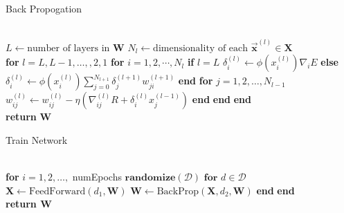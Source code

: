 \documentclass[prl,amsmath,amssymb,floatfix,superscriptaddress,notitlepage,twocolumn]{revtex4}
\newcommand{\vc}[1]{\vec{\mathbf{#1}}} 								%
\begin{document}
\begin{algorithm}[H]
\caption{Back Propogation}\label{back_prop}
\begin{algorithmic}[]
\Procedure{BackProp}{\textbf{X}, $\vc y$, \textbf{W}}\\
\State $L \gets \text{number of layers in }\textbf{W}$
\State $N_l \gets \text{dimensionality of each } \vc x^{(l)} \in \textbf{X}$\\

\State \textbf{for} $l=L,L-1,\dots,,2,1$
\State \hspace{.25cm}\textbf{for} $i = 1,2,\cdots, N_l$
\State \hspace{.50cm}\textbf{if} $l=L$
\State \hspace{.75cm} $\delta^{(l)}_i \gets \phi(x_i^{(l)})\nabla_i E$
\State \hspace{.50cm}\textbf{else}
\State \hspace{.75cm} $\delta^{(l)}_i\gets \phi(x^{(l)}_i)\sum_{j=0}^{N_{l+1}}\delta^{(l+1)}_jw^{(l+1)}_{ji}$
\State \hspace{.50cm}\textbf{end}
\State \hspace{.50cm}\textbf{for} $j=1,2,\dots,N_{l-1}$
\State \hspace{.75cm}$w^{(l)}_{ij}\gets w^{(l)}_{ij}-\eta\left(\nabla^{(l)}_{ij}R+\delta^{(l)}_ix^{(l-1)}_j\right)$
\State \hspace{.50cm}\textbf{end}
\State \hspace{.25cm}\textbf{end}
\State \textbf{end}\\

\State \textbf{return} \textbf{W}\\
\EndProcedure
\end{algorithmic}
\end{algorithm}

\begin{algorithm}[H]
\caption{Train Network}\label{train_ANN}
\begin{algorithmic}[]
\\

\State \textbf{for} $i = 1, 2, \dots,$ numEpochs
\State \hspace{.25cm} $\textbf{randomize}(\mathcal{D})$ 
\State \hspace{.25cm} $\textbf{for } d\in\mathcal{D}$
\State \hspace{.50cm} $\textbf{X} \gets \text{FeedForward}(d_1,\textbf{W})$
\State \hspace{.50cm} $\textbf{W} \gets \text{BackProp}(\textbf{X}, d_2,\textbf{W})$
\State \hspace{.25cm} \textbf{end}
\State \textbf{end}\\

\State \textbf{return W}\\

\EndProcedure
\end{algorithmic}
\end{algorithm}
\end{document}
